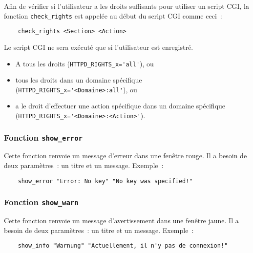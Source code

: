 Afin de vérifier si l'utilisateur a les droits suffisants pour utiliser un script CGI,
la fonction \texttt{check\_rights}  est appelée au début du script CGI comme ceci~:

\begin{example}
\begin{verbatim}
    check_rights <Section> <Action>
\end{verbatim}
\end{example}

Le script CGI ne sera exécuté que si l'utilisateur est enregistré.
\begin{itemize}
\item A tous les droits (\verb+HTTPD_RIGHTS_x='all'+), ou
\item tous les droits dans un domaine spécifique
    (\verb+HTTPD_RIGHTS_x='<Domaine>:all'+), ou
\item a le droit d'effectuer une action spécifique dans un domaine spécifique \\
    (\verb+HTTPD_RIGHTS_x='<Domaine>:<Action>'+).
\end{itemize}


\subsubsection{Fonction \texttt{show\_error}}

Cette fonction renvoie un message d'erreur dans une fenêtre rouge. Il a besoin de
deux paramètres~: un titre et un message. Exemple~:

\begin{example}
\begin{verbatim}
    show_error "Error: No key" "No key was specified!"
\end{verbatim}
\end{example}


\subsubsection{Fonction \texttt{show\_warn}}

Cette fonction renvoie un message d'avertissement dans une fenêtre jaune. Il a besoin de
deux paramètres~: un titre et un message. Exemple~:

\begin{example}
\begin{verbatim}
    show_info "Warnung" "Actuellement, il n'y pas de connexion!"
\end{verbatim}
\end{example}


